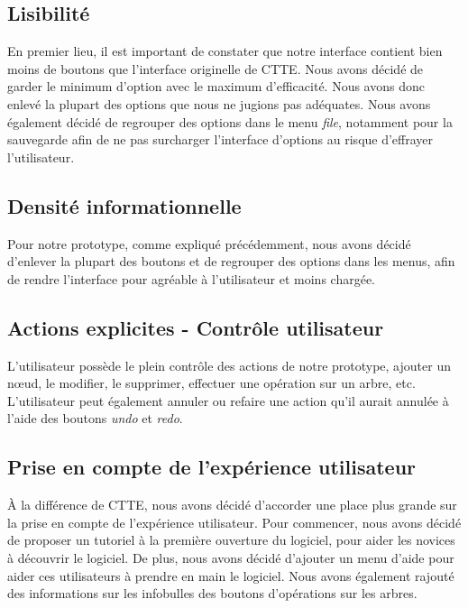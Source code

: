 \documentclass[12pt, a4paper]{article}
\begin{document}
\textcolor{NavyBlue}{\subsection{Lisibilité}}

En premier lieu, il est important de constater que notre interface contient bien moins de boutons que l'interface originelle de CTTE. Nous avons décidé de garder le minimum d'option avec le maximum d'efficacité. Nous avons donc enlevé la plupart des options que nous ne jugions pas adéquates. Nous avons également décidé de regrouper des options dans le menu \emph{file}, notamment pour la sauvegarde afin de ne pas surcharger l'interface d'options au risque d'effrayer l'utilisateur.

\textcolor{NavyBlue}{\subsection{Densité informationnelle}}

Pour notre prototype, comme expliqué précédemment, nous avons décidé d'enlever la plupart des boutons et de regrouper des options dans les menus, afin de rendre l'interface pour agréable à l'utilisateur et moins chargée.

\textcolor{NavyBlue}{\subsection{Actions explicites - Contrôle utilisateur}}

L'utilisateur possède le plein contrôle des actions de notre prototype, ajouter un nœud, le modifier, le supprimer, effectuer une opération sur un arbre, etc. L'utilisateur peut également annuler ou refaire une action qu'il aurait annulée à l'aide des boutons \emph{undo} et \emph{redo}.

\textcolor{NavyBlue}{\subsection{Prise en compte de l'expérience utilisateur}}

À la différence de CTTE, nous avons décidé d'accorder une place plus grande sur la prise en compte de l'expérience utilisateur. Pour commencer, nous avons décidé de proposer un tutoriel à la première ouverture du logiciel, pour aider les novices à découvrir le logiciel. De plus, nous avons décidé d'ajouter un menu d'aide pour aider ces utilisateurs à prendre en main le logiciel. Nous avons également rajouté des informations sur les infobulles des boutons d'opérations sur les arbres.\\
\end{document}
